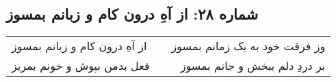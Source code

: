 \begin{center}
\section*{شماره ۲۸: از آهِ درون کام و زبانم بمسوز}
\label{sec:028}
\begin{longtable}{l p{0.5cm} r}
از آهِ درون کام و زبانم بمسوز
&&
وز فرقت خود به یک زمانم بمسوز
\\
فعل بدمن بپوش و خونم بمریز
&&
بر دردِ دلم ببخش و جانم بمسوز
\\
\end{longtable}
\end{center}
